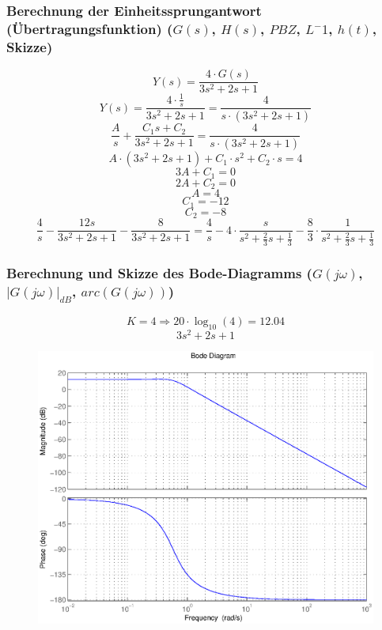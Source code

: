 \documentclass[a4paper,10pt,fleqn]{article}
\begin{document}
\subsubsection*{Berechnung der Einheitssprungantwort (Übertragungsfunktion) ($G(s)$, $H(s)$, $PBZ$, $L^-1$, $h(t)$, Skizze)}
\[ Y(s) = \frac{4 \cdot G(s)}{3 s^2 + 2 s + 1} \]
\[ Y(s) = \frac{4 \cdot \frac{1}{s}}{3 s^2 + 2 s + 1} = \frac{4}{s \cdot (3 s^2 + 2 s + 1)} \]
\[ \frac{A}{s} + \frac{C_1 s + C_2}{3 s^2 + 2 s + 1} = \frac{4}{s \cdot (3 s^2 + 2 s + 1)} \]
\[ A \cdot (3 s^2 + 2 s + 1) + C_1 \cdot s^2 + C_2 \cdot s = 4 \]
\[ 3 A + C_1 = 0 \]
\[ 2 A + C_2 = 0 \]
\[ A = 4 \]
\[ C_1 = -12 \]
\[ C_2 = -8 \]
\[ \frac{4}{s} - \frac{12 s}{3 s^2 + 2 s + 1} - \frac{8}{3 s^2 + 2 s + 1} 
= \frac{4}{s} - 4 \cdot \frac{s}{s^2 + \frac{2}{3} s + \frac{1}{3}} - \frac{8}{3} \cdot \frac{1}{s^2 + \frac{2}{3} s + \frac{1}{3}} \]

\subsubsection*{Berechnung und Skizze des Bode-Diagramms ($G(j\omega)$, $|G(j\omega)|_{dB}$, $arc(G(j\omega))$)}
\[ K = 4 \Rightarrow 20 \cdot \log_{10}(4) = 12.04 \]
\[ 3 s^2 + 2 s + 1 \]
\begin{figure}[h!]
\center
\includegraphics[width=\textwidth]{bode.eps}
\end{figure}
\end{document}
